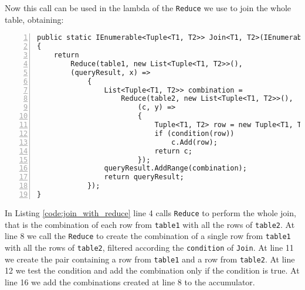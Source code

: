 \noindent
Now this call can be used in the lambda of the \texttt{Reduce} we use to join the whole table, obtaining:

\begin{lstlisting}[numbers = left, caption = Join with Reduce, label = code:join_with_reduce]
public static IEnumerable<Tuple<T1, T2>> Join<T1, T2>(IEnumerable<T1> table1, IEnumerable<T2> table2, Func<Tuple<T1, T2>, bool> condition)
{
	return
		Reduce(table1, new List<Tuple<T1, T2>>(),
		(queryResult, x) =>
			{
				List<Tuple<T1, T2>> combination =
					Reduce(table2, new List<Tuple<T1, T2>>(),
						(c, y) =>
						{
							Tuple<T1, T2> row = new Tuple<T1, T2>(x, y);
							if (condition(row))
								c.Add(row);
							return c;
						});
				queryResult.AddRange(combination);
				return queryResult;
			});
}
\end{lstlisting}

\noindent
In Listing \ref{code:join_with_reduce} line 4 calls \texttt{Reduce} to perform the whole join, that is the combination of each row from \texttt{table1} with all the rows of \texttt{table2}. At line 8 we call the \texttt{Reduce} to create the combination of a single row from \texttt{table1} with all the rows of \texttt{table2}, filtered according the \texttt{condition} of \texttt{Join}. At line 11 we create the pair containing a row from \texttt{table1} and a row from \texttt{table2}. At line 12 we test the condition and add the combination only if the condition is true. At line 16 we add the combinations created at line 8 to the accumulator.